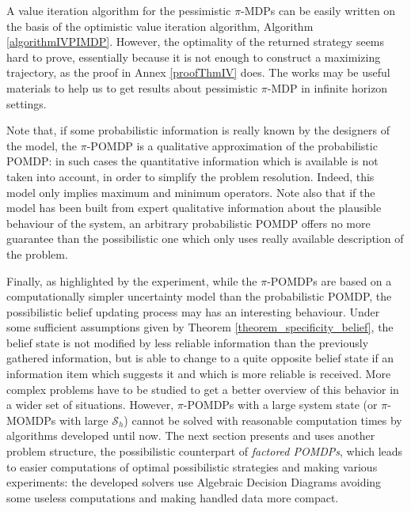 A value iteration algorithm for the pessimistic $\pi$-MDPs 
can be easily written on the basis of the optimistic value iteration algorithm,
Algorithm \ref{algorithmIVPIMDP}.
However, the optimality of the returned strategy seems 
hard to prove, essentially because it is not enough 
to construct a maximizing trajectory, 
as the proof in Annex \ref{proofThmIV} does. 
The works \cite{LIP61498,DBLP:books/daglib/0024909} 
may be useful materials to help us to get results about pessimistic 
$\pi$-MDP in infinite horizon settings.

Note that, if some probabilistic information 
is really known by the designers of the model,
the $\pi$-POMDP is a qualitative approximation
of the probabilistic POMDP: in such cases
the quantitative information which is available
is not taken into account, in order to simplify 
the problem resolution.
Indeed, this model only implies maximum and minimum operators.
Note also that if the model has been built from expert 
qualitative information about the plausible behaviour of the system,
an arbitrary probabilistic POMDP offers no more guarantee than
the possibilistic one 
which only uses really available description of the problem.

Finally, as highlighted by the experiment,
while the $\pi$-POMDPs are
based on a computationally simpler uncertainty model 
than the probabilistic POMDP,
the possibilistic belief updating process may 
has an interesting behaviour.
Under some sufficient assumptions
given by Theorem \ref{theorem_specificity_belief},
the belief state is not modified 
by less reliable information
than the previously gathered information, 
but is able to change to a quite opposite belief state
if an information item which suggests it and which is more reliable is received.
More complex problems have to be studied 
to get a better overview of this behavior
in a wider set of situations.
However, $\pi$-POMDPs with a large system state
(or $\pi$-MOMDPs with large $\mathcal{S}_h$) 
cannot be solved with reasonable computation times 
by algorithms developed until now.
The next section presents and uses another problem structure,
the possibilistic counterpart of \textit{factored POMDPs},
which leads to easier computations of optimal possibilistic strategies 
and making various experiments:
the developed solvers use Algebraic Decision Diagrams
avoiding some useless computations
and making handled data more compact.
